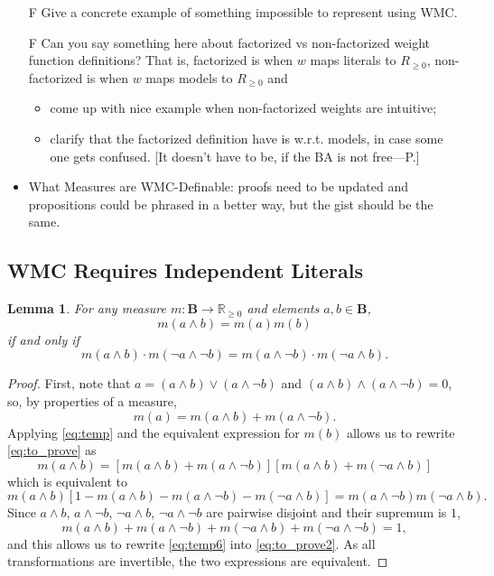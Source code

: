 \documentclass{article}
\newtheorem{lemma}{Lemma}
\theoremstyle{definition}
\theoremstyle{remark}
\begin{document}
\begin{itemize}
\item[F] Give a concrete example of something impossible to represent using WMC.
\item[F] Can you say something here about factorized vs non-factorized
  weight function definitions? That is, factorized is when $w$ maps literals to
  $R_{\ge 0}$, non-factorized is when $w$ maps models to $R_{\ge 0}$ and
  \begin{itemize}
  \item come up with nice example when non-factorized weights are intuitive;
  \item clarify that the factorized definition have is w.r.t. models, in case some
    one gets confused. [It doesn't have to be, if the BA is not free---P.]
  \end{itemize}
\item What Measures are WMC-Definable: proofs need to be updated and
  propositions could be phrased in a better way, but the gist should be the
  same.
\end{itemize}

\subsection{WMC Requires Independent Literals}

\begin{lemma} \label{lemma:before_theorem}
  For any measure $m\colon \mathbf{B} \to \mathbb{R}_{\ge 0}$ and elements $a, b
  \in \mathbf{B}$,
  \begin{equation} \label{eq:to_prove}
    m(a \land b) = m(a)m(b)
  \end{equation}
  if and only if
  \begin{equation} \label{eq:to_prove2}
    m(a \land b) \cdot m(\neg a \land \neg b) = m(a \land \neg b)
    \cdot m(\neg a \land b).
  \end{equation}
\end{lemma}
\begin{proof}
  First, note that $a = (a \land b) \lor (a \land \neg b)$ and $(a \land b)
  \land (a \land \neg b) = 0$, so, by properties of a measure,
  \begin{equation} \label{eq:temp}
    m(a) = m(a \land b) + m(a \land \neg b).
  \end{equation}
  Applying \cref{eq:temp} and the equivalent expression for $m(b)$ allows us
  to rewrite \cref{eq:to_prove} as
  \[
    m(a \land b) = [m(a \land b) + m(a \land \neg b)][m(a \land b) + m(\neg a
    \land b)]
  \]
  which is equivalent to
  \begin{equation} \label{eq:temp6}
    m(a \land b)[1 - m(a \land b) - m(a \land \neg b) - m(\neg a \land b)] = m(a
    \land \neg b)m(\neg a \land b).
  \end{equation}
  Since $a \land b$, $a \land \neg b$, $\neg a \land b$, $\neg a \land \neg b$
  are pairwise disjoint and their supremum is $1$,
  \[
    m(a \land b) + m(a \land \neg b) + m(\neg a \land b) + m(\neg a \land \neg
    b) = 1,
  \]
  and this allows us to rewrite \cref{eq:temp6} into \cref{eq:to_prove2}. As all
  transformations are invertible, the two expressions are equivalent.
\end{proof}
\end{document}
